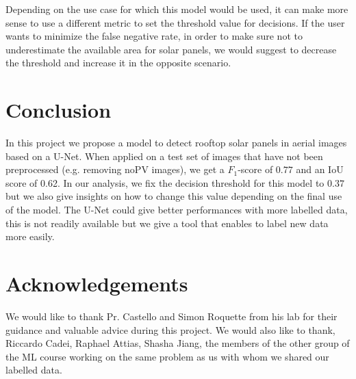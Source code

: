 \documentclass[10pt,conference]{IEEEtran}
\begin{document}
Depending on the use case for which this model would be used, it can make more sense to use a different metric to set the threshold value for decisions. If the user wants to minimize the false negative rate, in order to make sure not to underestimate the available area for solar panels, we would suggest to decrease the threshold and increase it in the opposite scenario.


\section{Conclusion}
In this project we propose a model to detect rooftop solar panels in aerial images based on a U-Net. When applied on a test set of images that have not been preprocessed (e.g. removing noPV images), we get a $F_1$-score of $0.77$ and an IoU score of 0.62. 
In our analysis, we fix the decision threshold for this model to $0.37$ but we also give insights on how to change this value depending on the final use of the model.
The U-Net could give better performances with more labelled data, this is not readily available but we give a tool that enables to label new data more easily.

\section*{Acknowledgements}
We would like to thank Pr. Castello and Simon Roquette from his lab for their guidance and valuable advice during this project. We would also like to thank, Riccardo Cadei, Raphael Attias, Shasha Jiang, the members of the other group of the ML course working on the same problem as us with whom we shared our labelled data.


\end{document}
